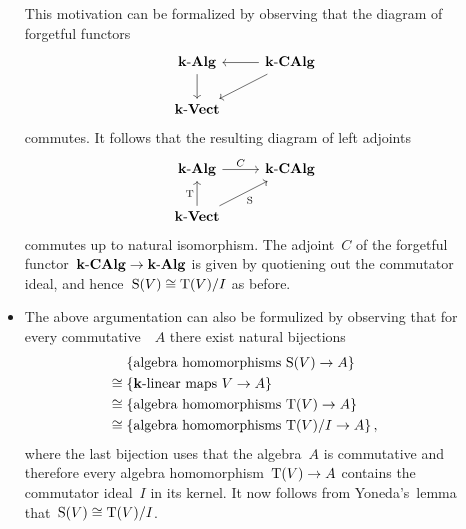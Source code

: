 \begin{recall}
\begin{description}
\begin{itemize}
          This motivation can be formalized by observing that the diagram of forgetful functors
          \[
            \begin{tikzcd}
              \cAlg{\kf}
              \arrow{d}
              &
              \cCAlg{\kf}
              \arrow{l}
              \arrow{dl}
              \\
              \cVect{\kf}
              &
              {}
            \end{tikzcd}
          \]
          commutes.
          It follows that the resulting diagram of left adjoints
          \[
            \begin{tikzcd}
              \cAlg{\kf}
              \arrow{r}[above]{C}
              &
              \cCAlg{\kf}
              \\
              \cVect{\kf}
              \arrow{u}[left]{\Tensor}
              \arrow{ur}[below right]{\Symm}
              &
              {}
            \end{tikzcd}
          \]
          commutes up to natural isomorphism.
          The adjoint~$C$ of the forgetful functor~$\mathbf{k}\text{-}\mathbf{CAlg} \to \mathbf{k}\text{-}\mathbf{Alg}$ is given by quotiening out the commutator ideal, and hence~$\operatorname{S}(V) \cong \operatorname{T}(V)/I$ as before.
        \item
          The above argumentation can also be formulized by observing that for every commutative~{\algebra{$\kf$}}~$A$ there exist natural bijections
          \begin{align*}
            {}&
            \{ \text{algebra homomorphisms~$\Symm(V) \to A$} \}
            \\
            \cong{}&
            \{ \text{{\linear{$\kf$}} maps~$V \to A$} \}
            \\
            \cong{}&
            \{ \text{algebra homomorphisms~$\Tensor(V) \to A$} \}
            \\
            \cong{}&
            \{ \text{algebra homomorphisms~$\Tensor(V)/I \to A$} \} \,,
          \end{align*}
          where the last bijection uses that the algebra~$A$ is commutative and therefore every algebra homomorphism~$\operatorname{T}(V) \to A$ contains the commutator ideal~$I$ in its kernel.
          It now follows from Yoneda’s~lemma that~$\operatorname{S}(V) \cong \operatorname{T}(V)/I$.
      \end{itemize}
  \end{description}
\end{recall}



